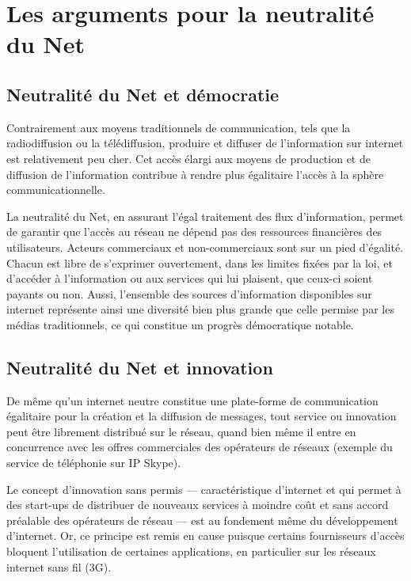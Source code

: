 \documentclass[a4paper,11pt,sf]{leaflet}
\begin{document}
\clearpage
\section{Les arguments pour la neutralité du Net}

\subsection{Neutralité du Net et démocratie}

Contrairement aux moyens traditionnels de communication, tels que la
radiodiffusion ou la télédiffusion, produire et diffuser de
l'information sur internet est relativement peu cher. Cet accès
élargi aux moyens de production et de diffusion de l'information contribue
à rendre plus égalitaire l'accès à la sphère communicationnelle.

La neutralité du Net, en assurant l'égal traitement des flux
d'information, permet de garantir que l'accès au réseau ne dépend pas
des ressources financières des utilisateurs. Acteurs commerciaux et
non-commerciaux sont sur un pied d'égalité. Chacun est libre de
s'exprimer ouvertement, dans les limites fixées par la loi, et d'accéder à
l'information ou aux services qui lui plaisent, que ceux-ci soient payants ou
non. Aussi, l'ensemble des sources d'information disponibles sur
internet représente ainsi une diversité bien plus grande que celle
permise par les médias traditionnels, ce qui constitue un progrès
démocratique notable.

\subsection{Neutralité du Net et innovation}

De même qu'un internet neutre constitue une plate-forme de communication
égalitaire pour la création et la diffusion de messages, tout service ou
innovation peut être librement distribué sur le réseau, quand bien même
il entre en concurrence avec les offres commerciales des opérateurs de
réseaux (exemple du service de téléphonie sur IP Skype).

Le concept d'\og{}innovation sans permis\fg{} --- caractéristique d'internet et
qui permet à des start-ups de distribuer de nouveaux services à moindre
coût et sans accord préalable des opérateurs de réseau --- est au
fondement même du développement d'internet. Or, ce principe est remis en
cause puisque certains fournisseurs d'accès bloquent l'utilisation de
certaines applications, en particulier sur les réseaux internet sans fil
(3G).
\end{document}
